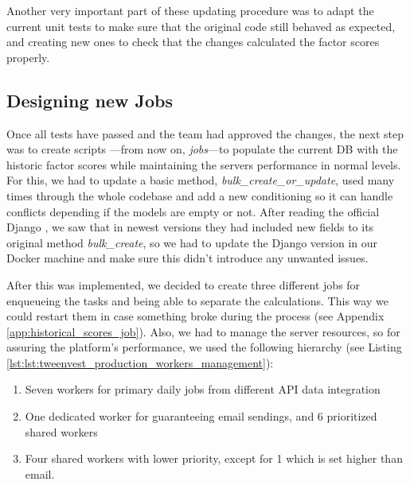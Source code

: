\documentclass[11pt,english,a4paper,hidelinks]{book}
\begin{document}
\vspace{0.5cm}
\noindent Another very important part of these updating procedure was to adapt the current unit tests to make sure that the original code still behaved as expected, and creating new ones to check that the changes calculated the factor scores properly.

\subsection{Designing new Jobs}

Once all tests have passed and the team had approved the changes, the next step was to create scripts —from now on, \textit{jobs}—to populate the current DB with the historic factor scores while maintaining the servers performance in normal levels. For this, we had to update a basic method, \textit{bulk\_create\_or\_update}, used many times through the whole codebase and add a new conditioning so it can handle conflicts depending if the models are empty or not. After reading the official Django \textcite{django2025queryset}, we saw that in newest versions they had included new fields to its original method \textit{bulk\_create}, so we had to update the Django version in our Docker machine and make sure this didn't introduce any unwanted issues.

\vspace{0.5cm}
\noindent After this was implemented, we decided to create three different jobs for enqueueing the tasks and being able to separate the calculations. This way we could restart them in case something broke during the process (see Appendix \ref{app:historical_scores_job}). Also, we had to manage the server resources, so for assuring the platform's performance, we used the following hierarchy (see Listing \ref{lst:lst:tweenvest_production_workers_management}):
\begin{enumerate}
    \item Seven workers for primary daily jobs from different API data integration
    \item One dedicated worker for guaranteeing email sendings, and 6 prioritized shared workers
    \item Four shared workers with lower priority, except for 1 which is set higher than email.
\end{enumerate}
\end{document}
